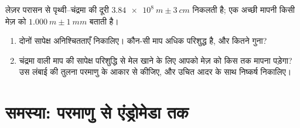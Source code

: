 \begin{exercise}[$\star\star\star$]\label{exo:g10:orders-of-magnitude:15}
लेज़र परासन से पृथ्वी--चंद्रमा की दूरी $\qty{3.84e8}{m} \pm \qty{3}{cm}$ निकलती है; एक अच्छी
मापनी किसी मेज़ को $\qty{1.000}{m} \pm \qty{1}{mm}$ बताती है।
\begin{enumerate}
  \item दोनों सापेक्ष अनिश्चितताएँ निकालिए। कौन-सी माप अधिक परिशुद्ध
        है, और कितने गुना?
  \item चंद्रमा वाली माप की सापेक्ष परिशुद्धि से मेल खाने के लिए आपको
        मेज़ को किस  तक मापना पड़ेगा? उस
        लंबाई की तुलना परमाणु के आकार से कीजिए, और उचित आदर के साथ
        निष्कर्ष निकालिए।
\end{enumerate}
\end{exercise}

\section{समस्या: परमाणु से एंड्रोमेडा तक}

